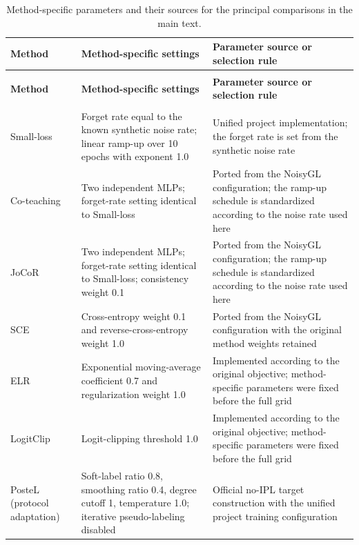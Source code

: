 \documentclass[10pt,letterpaper]{elsarticle}
\newlength{\TableWidth}
\begin{document}
\begingroup
\fontsize{9.5}{12}\selectfont
\setlength{\tabcolsep}{3pt}
\renewcommand{\arraystretch}{1.18}
\setlength{\TableWidth}{\dimexpr\linewidth-4\tabcolsep\relax}
\begin{longtable}{@{}>{\raggedright\arraybackslash}p{\dimexpr 0.200000\TableWidth\relax}>{\raggedright\arraybackslash}p{\dimexpr 0.440000\TableWidth\relax}>{\raggedright\arraybackslash}p{\dimexpr 0.360000\TableWidth\relax}@{}}
\caption{Method-specific parameters and their sources for the principal comparisons in the main text.}\label{tab:G.2}\\
\toprule
\textbf{Method} & \textbf{Method-specific settings} & \textbf{Parameter source or selection rule} \\
\midrule\endfirsthead
\multicolumn{3}{l}{\small\itshape Table \thetable{} (continued)}\\
\toprule
\textbf{Method} & \textbf{Method-specific settings} & \textbf{Parameter source or selection rule} \\
\midrule\endhead
\midrule\multicolumn{3}{r}{\small\itshape Continued on the next page}\\\endfoot
\bottomrule\endlastfoot
Small-loss & Forget rate equal to the known synthetic noise rate; linear ramp-up over 10 epochs with exponent 1.0 & Unified project implementation; the forget rate is set from the synthetic noise rate \\
Co-teaching & Two independent MLPs; forget-rate setting identical to Small-loss & Ported from the NoisyGL configuration; the ramp-up schedule is standardized according to the noise rate used here \\
JoCoR & Two independent MLPs; forget-rate setting identical to Small-loss; consistency weight 0.1 & Ported from the NoisyGL configuration; the ramp-up schedule is standardized according to the noise rate used here \\
SCE & Cross-entropy weight 0.1 and reverse-cross-entropy weight 1.0 & Ported from the NoisyGL configuration with the original method weights retained \\
ELR & Exponential moving-average coefficient 0.7 and regularization weight 1.0 & Implemented according to the original objective; method-specific parameters were fixed before the full grid \\
LogitClip & Logit-clipping threshold 1.0 & Implemented according to the original objective; method-specific parameters were fixed before the full grid \\
PosteL (protocol adaptation) & Soft-label ratio 0.8, smoothing ratio 0.4, degree cutoff 1, temperature 1.0; iterative pseudo-labeling disabled & Official no-IPL target construction with the unified project training configuration \\

\end{longtable}
\end{document}
